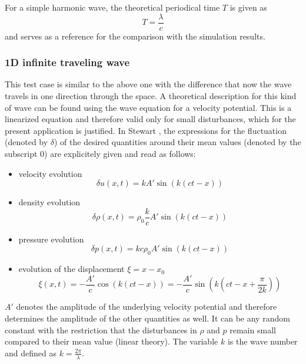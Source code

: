 \documentclass{report}
\begin{document}
For a simple harmonic wave, the theoretical periodical time $T$ is given as \cite{Stewart1930}
\begin{equation}
 T=\frac{\lambda}{c}
\end{equation}
and serves as a reference for the comparison with the simulation results.





\subsubsection{1D infinite traveling wave}
This test case is similar to the above one with the difference that now the wave travels in one direction through the space. A theoretical description for this kind of wave can be found using the wave equation for a velocity potential. This is a linearized equation and therefore valid only for small disturbances, which for the present application is justified. In Stewart \cite{Stewart1930}, the expressions for the fluctuation (denoted by $\delta$) of the desired quantities around their mean values (denoted by the subscript $0$) are explicitely given and read as follows:
\begin{itemize}
\item velocity evolution 
\begin{equation}
\label{eq:1DWaveDetla_u}
 \delta u(x,t)=k A' \sin(k(ct-x))
\end{equation}
\item density evolution 
\begin{equation}
 \delta \rho(x,t)=\rho_0\frac{k}{c} A'  \sin(k(ct-x))
\end{equation}
\item pressure evolution 
\begin{equation}
 \delta p(x,t)=k c \rho_0 A'  \sin(k(ct-x))
\end{equation}
\item evolution of the displacement $\xi=x-x_0$
\begin{equation}
\label{eq:1DWaveDisplacement}
 \xi(x,t)=-\frac{A' }{c} \cos(k(ct-x))=-\frac{A' }{c} \sin\left(k\left(ct-x+\frac{\pi}{2k}\right)\right)
\end{equation}

\end{itemize}

$A'$ denotes the amplitude of the underlying velocity potential and therefore determines the amplitude of the other quantities as well. It can be any random constant with the restriction that the disturbances in $\rho$ and $p$ remain small compared to their mean value (linear theory). The variable $k$ is the  wave number and defined as $k=\frac{2\pi}{\lambda}$.
\end{document}
